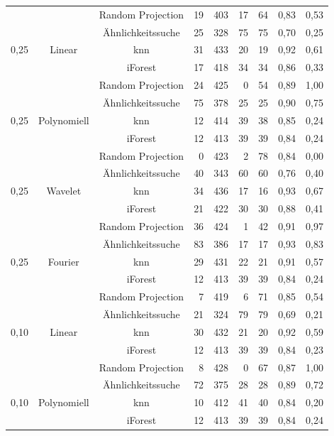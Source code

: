 \begin{table}
\begin{tabular}{ccc|r<{\hspace{1mm}}r<{\hspace{1mm}}r<{\hspace{1mm}}r<{\hspace{1mm}}r<{\hspace{1mm}}r<{\hspace{1mm}}}
   & & Random Projection & 19 & 403 & 17 & 64 & 0,83 & 0,53\\
   & & Ähnlichkeitssuche & 25 & 328 & 75 & 75 & 0,70 & 0,25\\
   \midrule
   \multirow{4}{*}{0,25} & \multirow{4}{*}{Linear} & knn & 31 & 433 & 20 & 19 & 0,92 & 0,61 \\
   & & iForest & 17 & 418 & 34 & 34 & 0,86 & 0,33 \\
   & & Random Projection & 24 & 425 & 0 & 54 & 0,89 & 1,00 \\
   & & Ähnlichkeitssuche & 75 & 378 & 25 & 25 & 0,90 & 0,75 \\
   \midrule
   \multirow{4}{*}{0,25} & \multirow{4}{*}{Polynomiell} & knn & 12 & 414 & 39 & 38 & 0,85 & 0,24 \\
   & & iForest & 12 & 413 & 39 & 39 & 0,84 & 0,24 \\
   & & Random Projection & 0 & 423 & 2 & 78 & 0,84 & 0,00 \\
   & & Ähnlichkeitssuche & 40 & 343 & 60 & 60 & 0,76 & 0,40 \\
   \midrule
   \multirow{4}{*}{0,25} & \multirow{4}{*}{Wavelet} & knn & 34 & 436 & 17 & 16 & 0,93 & 0,67 \\
   & & iForest & 21 & 422 & 30 & 30 & 0,88 & 0,41 \\
   & & Random Projection & 36 & 424 & 1 & 42 & 0,91 & 0,97 \\
   & & Ähnlichkeitssuche & 83 & 386 & 17 & 17 & 0,93 & 0,83 \\
   \midrule
   \multirow{4}{*}{0,25} & \multirow{4}{*}{Fourier} & knn & 29 & 431 & 22 & 21 & 0,91 & 0,57 \\
   & & iForest & 12 & 413 & 39 & 39 & 0,84 & 0,24 \\
   & & Random Projection & 7 & 419 & 6 & 71 & 0,85 & 0,54 \\
   & & Ähnlichkeitssuche & 21 & 324 & 79 & 79 & 0,69 & 0,21 \\
   \midrule
   \multirow{4}{*}{0,10} & \multirow{4}{*}{Linear} & knn & 30 & 432 & 21 & 20 & 0,92 & 0,59 \\
   & & iForest & 12 & 413 & 39 & 39 & 0,84 & 0,23 \\
   & & Random Projection & 8 & 428 & 0 & 67 & 0,87 & 1,00 \\
   & & Ähnlichkeitssuche & 72 & 375 & 28 & 28 & 0,89 & 0,72 \\
   \midrule
   \multirow{4}{*}{0,10} & \multirow{4}{*}{Polynomiell} & knn & 10 & 412 & 41 & 40 & 0,84 & 0,20 \\
   & & iForest & 12 & 413 & 39 & 39 & 0,84 & 0,24 \\

\end{tabular}
\end{table}
